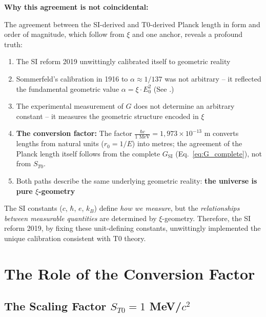 	\begin{warning}
		\textbf{Why this agreement is not coincidental:}
		
		The agreement between the SI-derived and T0-derived Planck length in form and order of magnitude, which follow from $\xi$ and one anchor, reveals a profound truth:
		
		\begin{enumerate}
			\item The SI reform 2019 unwittingly calibrated itself to geometric reality
			
			\item Sommerfeld's calibration in 1916 to $\alpha \approx 1/137$ was not arbitrary -- it reflected the fundamental geometric value $\alpha = \xi \cdot E_0^2$ (See \cite{T0_fine_structure_En}.)
			
			\item The experimental measurement of $G$ does not determine an arbitrary constant -- it measures the geometric structure encoded in $\xi$
			
			\item \textbf{The conversion factor:} The factor $\frac{\hbar c}{1 \text{ MeV}} = 1{,}973 \times 10^{-13}$ m converts lengths from natural units ($r_0 = 1/E$) into metres; the agreement of the Planck length itself follows from the complete $G_{\text{SI}}$ (Eq.~\eqref{eq:G_complete}), not from $S_{T0}$.
			
			\item Both paths describe the same underlying geometric reality: \textbf{the universe is pure $\xi$-geometry}
		\end{enumerate}
		
		The SI constants ($c$, $\hbar$, $e$, $k_B$) define \emph{how we measure}, but the \emph{relationships between measurable quantities} are determined by $\xi$-geometry. Therefore, the SI reform 2019, by fixing these unit-defining constants, unwittingly implemented the unique calibration consistent with T0 theory.
	\end{warning}
	
	\section{The Role of the Conversion Factor}
	
	\subsection{The Scaling Factor $S_{T0} = 1$ MeV/$c^2$}
	
